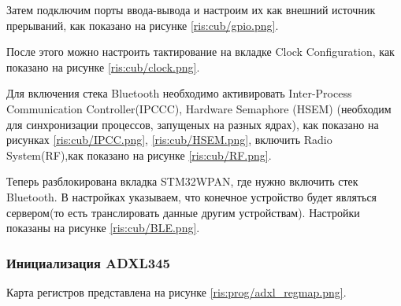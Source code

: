 \begin{sloppypar}
Затем подключим порты ввода-вывода и настроим их как внешний источник прерываний, как показано на рисунке \ref{ris:cub/gpio.png}.

После этого можно настроить тактирование на вкладке Clock Configuration, как показано на рисунке \ref{ris:cub/clock.png}.

Для включения стека Bluetooth необходимо активировать Inter-Process Communication Controller(IPCCC), Hardware Semaphore (HSEM) (необходим для синхронизации процессов, запущеных на разных ядрах), как показано на рисунках  \ref{ris:cub/IPCC.png}, \ref{ris:cub/HSEM.png}, включить Radio System(RF),как показано на рисунке \ref{ris:cub/RF.png}.

Теперь разблокирована вкладка STM32WPAN, где нужно включить стек Bluetooth. В настройках указываем, что конечное устройство будет являться сервером(то есть транслировать данные другим устройствам). Настройки показаны на рисунке \ref{ris:cub/BLE.png}.


























\subsubsection{Инициализация ADXL345}
 Карта регистров представлена на рисунке \ref{ris:prog/adxl_regmap.png}.


\end{sloppypar}
